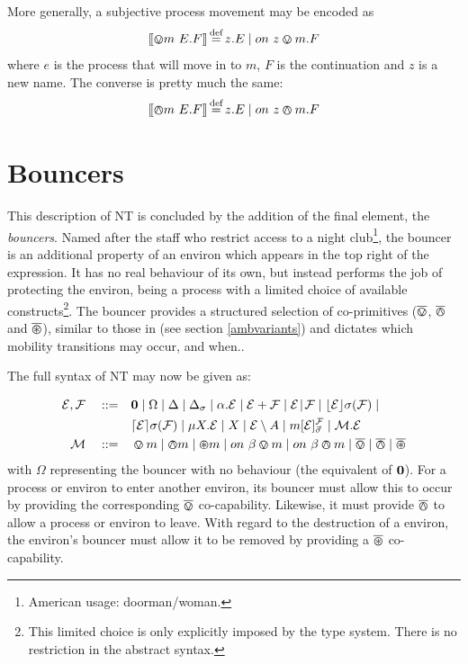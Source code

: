 More generally, a subjective process movement may be encoded as
\begin{equation}
[\hspace{-0.3ex}[ \varovee m\ {E}.F ]\hspace{-0.3ex}] \operatorname{\stackrel{\textrm{def}}{=}} z.E \;|\; on\ z \varovee m.F
\end{equation}
where $e$ is the process that will move in to $m$, $F$ is
the continuation and $z$ is a new name.  The converse is pretty much the same:
\begin{equation}
[\hspace{-0.3ex}[ \varowedge m\ {E}.F ]\hspace{-0.3ex}] \operatorname{\stackrel{\textrm{def}}{=}} z.E \;|\; on\ z \varowedge m.F
\end{equation}

\section{Bouncers}
\label{bouncers}

This description of NT is concluded by the addition of the final
element, the \emph{bouncers}.  Named after the staff who restrict
access to a night club\footnote{American usage: doorman/woman.}, the
bouncer is an additional property of an environ which appears in the
top right of the expression.  It has no real behaviour of its own, but
instead performs the job of protecting the environ, being a process
with a limited choice of available constructs\footnote{This limited
  choice is only explicitly imposed by the type system.  There is no
  restriction in the abstract syntax.}.  The bouncer provides a
structured selection of co-primitives ($\overline{\varovee}$, $\overline{\varowedge}$ and $\overline{\varoast}$),
similar to those in \cite{sangiorgi:mobsafeambients} (see section
\ref{ambvariants}) and dictates which mobility transitions may occur,
and when..

The full syntax of NT may now be given as:

\begin{equation}
  \begin{aligned}
    \text{$\mathcal{E}$}, \text{$\mathcal{F}$} \quad \mathrel{::=} \quad &
      \textbf{0}  \mid
      \Omega \mid
      \Delta \mid
      \Delta_{\sigma} \mid
      \alpha . \text{$\mathcal{E}$}  \mid
      \text{$\mathcal{E}$} + \text{$\mathcal{F}$} \mid
      \text{$\mathcal{E}$} \mathrel{\!|\!} \text{$\mathcal{F}$} \mid
      \lfloor{\text{$\mathcal{E}$}}\rfloor {\sigma} ({\text{$\mathcal{F}$}}) \mid \\
    & \lceil{\text{$\mathcal{E}$}}\rceil {\sigma} ({\text{$\mathcal{F}$}}) \mid 
      \mu X . \text{$\mathcal{E}$} \mid
      X \mid 
      \text{$\mathcal{E}$} \setminus {A} \mid
      {m}[ \text{$\mathcal{E}$} ]^{\text{$\mathcal{F}$}}_{\vec{\sigma}} \mid
      \text{$\mathcal{M}$} . \text{$\mathcal{E}$} \\
   \text{$\mathcal{M}$} \quad \mathrel{::=} \quad & \varovee m \mid \varowedge m \mid \varoast m \mid
      on\ \beta \varovee m \mid on\ \beta \varowedge m \mid \overline{\varovee} \mid
      \overline{\varowedge} \mid \overline{\varoast}
   \end{aligned}
   \label{eqn:tnt-syntax}
\end{equation}
with $\Omega$ representing the bouncer with no behaviour (the
equivalent of $\textbf{0}$).  For a process or environ to enter another
environ, its bouncer must allow this to occur by providing the
corresponding $\overline{\varovee}$ co-capability.  Likewise, it must provide $\overline{\varowedge}$
to allow a process or environ to leave.  With regard to the destruction
of a environ, the environ's bouncer must allow it to be removed by
providing a $\overline{\varoast}$ co-capability.

